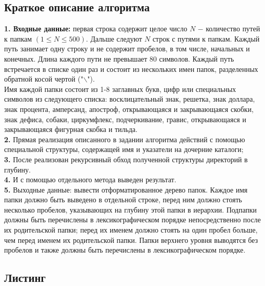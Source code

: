 \documentclass[a5paper, 10pt]{article}
\theoremstyle{definition}
\theoremstyle{plain}
\theoremstyle{remark}
\begin{document}
\subsection{Краткое описание алгоритма}
\textbf{1. Входные данные:} первая строка содержит целое число $N$ $-$ количество путей к папкам $(1 \leq N \leq 500)$. Дальше следуют $N$ строк с путями к папкам. Каждый путь занимает одну строку и не содержит пробелов, в том числе, начальных и конечных. Длина каждого пути не превышает $80$ символов. Каждый путь встречается в списке один раз и состоит из нескольких имен папок, разделенных обратной косой чертой ("$\backslash$"). \\
Имя каждой папки состоит из 1-8 заглавных букв, цифр или специальных символов из следующего списка: восклицательный знак, решетка, знак доллара, знак процента, амперсанд, апостроф, открывающаяся и закрывающаяся скобки, знак дефиса, собаки, циркумфлекс, подчеркивание, гравис, открывающаяся и закрывающаяся фигурная скобка и тильда. \\
\textbf{2.} Прямая реализация описанного в задании алгоритма действий с помощью специальной структуры, содержащей имя и указатели на дочерние каталоги; \\
\textbf{3.} После реализован рекурсивный обход полученной структуры директорий в глубину. \\
\textbf{4.}  И с помощью отдельного метода выведен результат.\\
\textbf{5.} Выходные данные: вывести отформатированное дерево папок. Каждое имя папки должно быть выведено в отдельной строке, перед ним должно стоять несколько пробелов, указывающих на глубину этой папки в иерархии. Подпапки должны быть перечислены в лексикографическом порядке непосредственно после их родительской папки; перед их именем должно стоять на один пробел больше, чем перед именем их родительской папки. Папки верхнего уровня выводятся без пробелов и также должны быть перечислены в лексикографическом порядке.

\subsection{Листинг}
\end{document}
